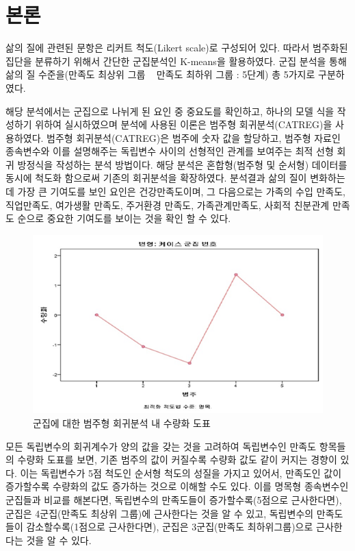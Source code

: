 \documentclass[a4paper, amsmath]{oblivoir}
\begin{document}
\section{본론}
삶의 질에 관련된 문항은 리커트 척도(Likert scale)로 구성되어 있다. 
따라서 범주화된 집단을 분류하기 위해서 간단한 군집분석인 K-means을 활용하였다. 
군집 분석을 통해 삶의 질 수준을(만족도 최상위 그룹 ~ 만족도 최하위 그룹 : 5단계) 총 5가지로 구분하였다.

해당 분석에서는 군집으로 나뉘게 된 요인 중 중요도를 확인하고, 하나의 모델 식을 작성하기 위하여 실시하였으며 분석에 사용된 이론은 범주형 회귀분석(CATREG)을 사용하였다\cite{catreg2021}.
범주형 회귀분석(CATREG)은 범주에 숫자 값을 할당하고, 범주형 자료인 종속변수와 이를 설명해주는 독립변수 사이의 선형적인 관계를 보여주는 최적 선형 회귀 방정식을 작성하는 분석 방법이다.
해당 분석은 혼합형(범주형 및 순서형) 데이터를 동시에 척도화 함으로써 기존의 회귀분석을 확장하였다.
분석결과 삶의 질이 변화하는 데 가장 큰 기여도를 보인 요인은 건강만족도이며, 그 다음으로는 가족의 수입 만족도, 직업만족도, 여가생활 만족도, 주거환경 만족도, 가족관계만족도, 사회적 친분관계 만족도 순으로 중요한 기여도를 보이는 것을 확인 할 수 있다. 

\begin{figure}[!h]
    \begin{center}    
    \includegraphics[width=0.8\linewidth]{./figz/image02.png}
    \end{center}    
    \caption{군집에 대한 범주형 회귀분석 내 수량화 도표}    
    \label{fig:long}    
    \label{fig:onecol}
\end{figure}

모든 독립변수의 회귀계수가 양의 값을 갖는 것을 고려하여 독립변수인 만족도 항목들의 수량화 도표를 보면, 기존 범주의 값이 커질수록 수량화 값도 같이 커지는 경향이 있다.
이는 독립변수가 5점 척도인 순서형 척도의 성질을 가지고 있어서, 만족도인 값이 증가할수록 수량화의 값도 증가하는 것으로 이해할 수도 있다.
이를 명목형 종속변수인 군집들과 비교를 해본다면, 독립변수의 만족도들이 증가할수록(5점으로 근사한다면), 군집은 4군집(만족도 최상위 그룹)에 근사한다는 것을 알 수 있고, 독립변수의 만족도들이 감소할수록(1점으로 근사한다면), 군집은 3군집(만족도 최하위그룹)으로 근사한다는 것을 알 수 있다.
\end{document}
